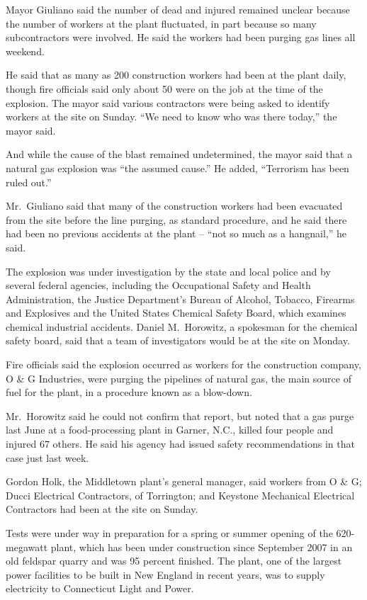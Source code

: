 ﻿\documentclass[12pt]{article}
\begin{document}
Mayor Giuliano said the number of dead and injured remained unclear because the number of workers at
the plant fluctuated, in part because so many subcontractors were involved. He said the workers had
been purging gas lines all weekend.

He said that as many as 200 construction workers had been at the plant daily, though fire officials
said only about 50 were on the job at the time of the explosion. The mayor said various contractors
were being asked to identify workers at the site on Sunday. ``We need to know who was there today,''
the mayor said.

And while the cause of the blast remained undetermined, the mayor said that a natural gas explosion
was ``the assumed cause.'' He added, ``Terrorism has been ruled out.''

Mr.~Giuliano said that many of the construction workers had been evacuated from the site before the
line purging, as standard procedure, and he said there had been no previous accidents at the plant
-- ``not so much as a hangnail,'' he said.

The explosion was under investigation by the state and local police and by several federal agencies,
including the Occupational Safety and Health Administration, the Justice Department's Bureau of
Alcohol, Tobacco, Firearms and Explosives and the United States Chemical Safety Board, which
examines chemical industrial accidents. Daniel M.~Horowitz, a spokesman for the chemical safety
board, said that a team of investigators would be at the site on Monday.

Fire officials said the explosion occurred as workers for the construction company, O \& G
Industries, were purging the pipelines of natural gas, the main source of fuel for the plant, in a
procedure known as a blow-down.

Mr.~Horowitz said he could not confirm that report, but noted that a gas purge last June at a
food-processing plant in Garner, N.C., killed four people and injured 67 others. He said his agency
had issued safety recommendations in that case just last week.

Gordon Holk, the Middletown plant's general manager, said workers from O \& G; Ducci Electrical
Contractors, of Torrington; and Keystone Mechanical Electrical Contractors had been at the site on
Sunday.

Tests were under way in preparation for a spring or summer opening of the 620-megawatt plant, which
has been under construction since September 2007 in an old feldspar quarry and was 95 percent
finished. The plant, one of the largest power facilities to be built in New England in recent years,
was to supply electricity to Connecticut Light and Power.
\end{document}
